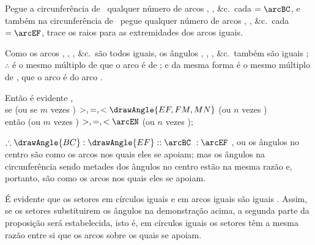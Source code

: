 \documentclass[booklanguage=brazilian]{byrnebook}
\begin{document}
Pegue a circunferência de \circleG\ qualquer número de arcos
,
, \&c.\ cada $= \arcBC$, e também na circunferência de \circleH\ pegue qualquer número de arcos
,
, \&c.\ cada $= \arcEF$, trace os raios para as extremidades dos arcos iguais.

Como os arcos \arcBC, \arcCK, \arcKL, \&c.\ são todos iguais, os ângulos , , , \&c.\ também são iguais ; $\therefore$  é o mesmo múltiplo de  que o arco  é de \arcBC; e da mesma forma  é o mesmo múltiplo de , que o arco  é do arco \arcEF.

\begin{center}
Então é evidente ,\\
se  (ou se $m$ vezes ) $>, =, < \drawAngle{EF,FM,MN}$ (ou $n$ vezes )\\
então \arcBL (ou $m$ vezes \arcBC) $>, =, < \arcEN$ (ou $n$ vezes \arcEF);
\end{center}

$\therefore \drawAngle{BC} : \drawAngle{EF} :: \arcBC\ : \arcEF$ , ou os ângulos no centro são como os arcos nos quais eles se apoiam; mas os ângulos na circunferência sendo metades dos ângulos no centro  estão na mesma razão  e, portanto, são como os arcos nos quais eles se apoiam.

É evidente que os setores em círculos iguais e em arcos iguais são iguais . Assim, se os setores substituirem os ângulos na demonstração acima, a segunda parte da proposição será estabelecida, isto é, em círculos iguais os setores têm a mesma razão entre si que os arcos sobre os quais se apoiam.
\end{document}
